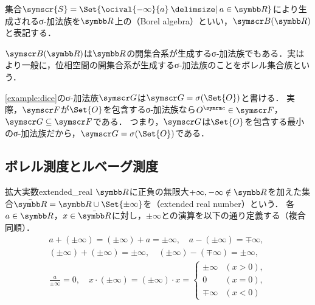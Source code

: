 \documentclass[../../main]{subfiles}
\begin{document}
\begin{example}[ボレル集合族]
  集合\(\symscr{S}=\Set{\ocival{-\infty}{a}\given a\in\numset{R}}\)により生成されるσ‐加法族を\(\numset{R}\)上の（Borel algebra）といい，\(\borelset{\numset{R}}\)と表記する．
\end{example}

\begin{note}
  \(\borelset{\numset{R}}\)は\(\numset{R}\)の開集合系が生成するσ‐加法族でもある．実はより一般に，位相空間の開集合系が生成するσ‐加法族のことをボレル集合族という．
\end{note}

\begin{example}
  \cref{example:dice}のσ‐加法族\(\sigmaalg{G}\)は\(\sigmaalg{G}=\sigmagen{\Set{O}}\)と書ける．
  実際，\(\sigmaalg{F}\)が\(\Set{O}\)を包含するσ‐加法族なら\(\scomp{O}\in\sigmaalg{F}\)，\(\sigmaalg{G}\subseteq\sigmaalg{F}\)である．
  つまり，\(\sigmaalg{G}\)は\(\Set{O}\)を包含する最小のσ‐加法族だから，\(\sigmaalg{G}=\sigmagen{\Set{O}}\)である．
\end{example}

\subsection{ボレル測度とルベーグ測度}

\begin{definition}{拡大実数}{extended_real}
  \(\numset{R}\)に正負の無限大\(+\infty,-\infty\notin\numset{R}\)を加えた集合\(\extendedreal=\numset{R}\cup\Set{\pm\infty}\)を（extended real number）という．
  各\(a\in\numset{R}\)，\(x\in\extendedreal\)に対し，\(\pm\infty\)との演算を以下の通り定義する（複合同順）．
  \begin{gather*}
    a+(\pm\infty) = (\pm\infty)+a = \pm\infty,
    \quad a-(\pm\infty) = \mp\infty, \\
    (\pm\infty)+(\pm\infty) = \pm\infty,
    \quad(\pm\infty)-(\mp\infty) = \pm\infty, \\
    \frac{a}{\pm\infty} = 0,
    \quad x\cdot(\pm\infty) = (\pm\infty)\cdot x = \begin{cases}\pm\infty & (x>0),\\ 0 & (x=0), \\ \mp\infty & (x<0)\end{cases}
  \end{gather*}
\end{definition}
\end{document}
